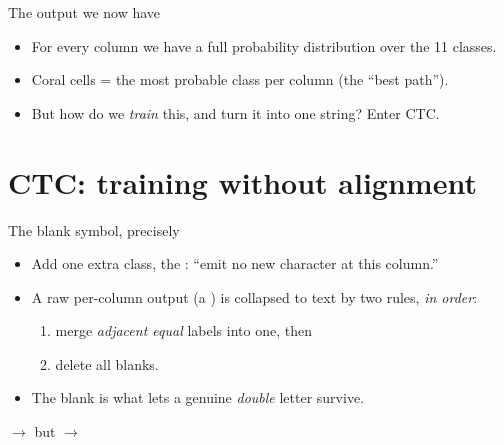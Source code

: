 \documentclass[10pt,aspectratio=169]{beamer}
\begin{document}
\begin{frame}{The output we now have}
  \begin{center}
  \end{center}
  \begin{itemize}
    \item For every column we have a full probability distribution over the 11 classes.
    \item Coral cells = the most probable class per column (the ``best path'').
    \item But how do we \emph{train} this, and turn it into one string? Enter CTC.
  \end{itemize}
\end{frame}

\section{CTC: training without alignment}

\begin{frame}{The blank symbol, precisely}
  \begin{itemize}
    \item Add one extra class, the  \code{-}: ``emit no new character at this column.''
    \item A raw per-column output (a ) is collapsed to text by two rules, \emph{in order}:
    \begin{enumerate}
      \item merge \emph{adjacent equal} labels into one, then
      \item delete all blanks.
    \end{enumerate}
    \item The blank is what lets a genuine \emph{double} letter survive.
  \end{itemize}
  \begin{mathbox}
     $\to$  \qquad but \qquad {} $\to$ 
  \end{mathbox}
\end{frame}
\end{document}
